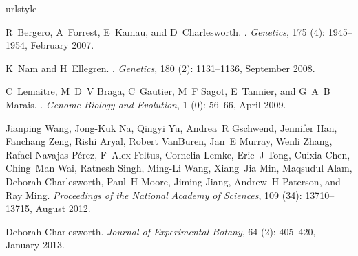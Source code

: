 \begin{thebibliography}{63}
\providecommand{\natexlab}[1]{#1}
\providecommand{\url}[1]{\texttt{#1}}
\expandafter\ifx\csname urlstyle\endcsname\relax
  \providecommand{\doi}[1]{doi: #1}\else
  \providecommand{\doi}{doi: \begingroup \urlstyle{rm}\Url}\fi

R~Bergero, A~Forrest, E~Kamau, and D~Charlesworth.
.
\newblock \emph{Genetics}, 175 (4): 1945--1954, February
  2007.

K~Nam and H~Ellegren.
.
\newblock \emph{Genetics}, 180 (2): 1131--1136, September
  2008.

C~Lemaitre, M~D~V Braga, C~Gautier, M~F Sagot, E~Tannier, and G~A~B Marais.
.
\newblock \emph{Genome Biology and Evolution}, 1 (0): 56--66,
  April 2009.

Jianping Wang, Jong-Kuk Na, Qingyi Yu, Andrea~R Gschwend, Jennifer Han,
  Fanchang Zeng, Rishi Aryal, Robert VanBuren, Jan~E Murray, Wenli Zhang,
  Rafael Navajas-P{\'e}rez, F~Alex Feltus, Cornelia Lemke, Eric~J Tong, Cuixia
  Chen, Ching~Man Wai, Ratnesh Singh, Ming-Li Wang, Xiang~Jia Min, Maqsudul
  Alam, Deborah Charlesworth, Paul~H Moore, Jiming Jiang, Andrew~H Paterson,
  and Ray Ming.
\newblock \emph{Proceedings of the National Academy of Sciences}, 109
  (34): 13710--13715, August 2012.

Deborah Charlesworth.
\newblock \emph{Journal of Experimental Botany}, 64 (2):
  405--420, January 2013.


\end{thebibliography}
